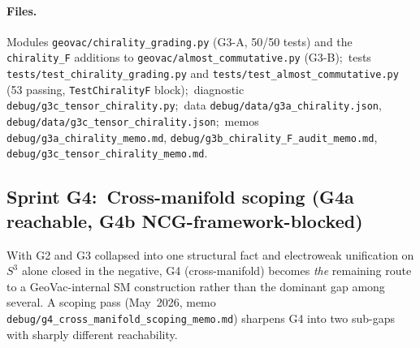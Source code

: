 \documentclass[11pt]{article}
\begin{document}
\paragraph{Files.}  Modules
\texttt{geovac/chirality\_grading.py} (G3-A, 50/50 tests) and the
\texttt{chirality\_F} additions to
\texttt{geovac/almost\_commutative.py} (G3-B);\ tests
\texttt{tests/test\_chirality\_grading.py} and
\texttt{tests/test\_almost\_commutative.py} (53 passing,
\texttt{TestChiralityF} block);\ diagnostic
\texttt{debug/g3c\_tensor\_chirality.py};\ data
\texttt{debug/data/g3a\_chirality.json},
\texttt{debug/data/g3c\_tensor\_chirality.json};\ memos
\texttt{debug/g3a\_chirality\_memo.md},
\texttt{debug/g3b\_chirality\_F\_audit\_memo.md},
\texttt{debug/g3c\_tensor\_chirality\_memo.md}.

\subsection{Sprint G4:\ Cross-manifold scoping (G4a reachable, G4b
NCG-framework-blocked)}
\label{sec:g4}

With G2 and G3 collapsed into one structural fact and electroweak
unification on $S^3$ alone closed in the negative, G4
(cross-manifold) becomes \emph{the} remaining route to a
GeoVac-internal SM construction rather than the dominant gap among
several.  A scoping pass (May~2026, memo
\texttt{debug/g4\_cross\_manifold\_scoping\_memo.md}) sharpens G4
into two sub-gaps with sharply different reachability.
\end{document}
